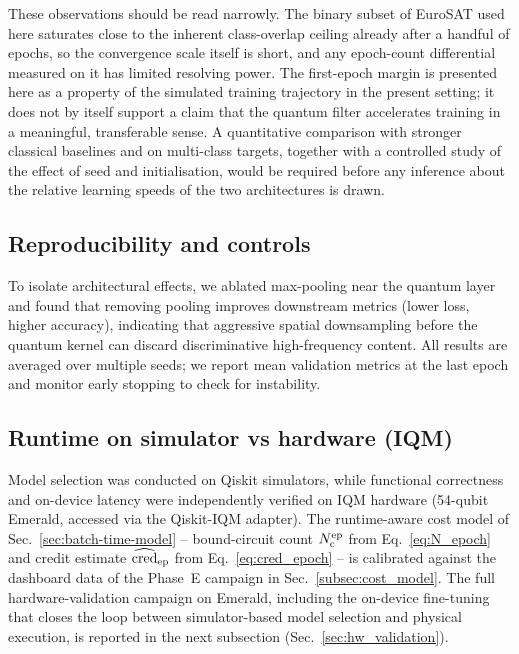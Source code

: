 These observations should be read narrowly. The binary subset of EuroSAT used here saturates close to the inherent class-overlap ceiling already after a handful of epochs, so the convergence scale itself is short, and any epoch-count differential measured on it has limited resolving power. The first-epoch margin is presented here as a property of the simulated training trajectory in the present setting; it does not by itself support a claim that the quantum filter accelerates training in a meaningful, transferable sense. A quantitative comparison with stronger classical baselines and on multi-class targets, together with a controlled study of the effect of seed and initialisation, would be required before any inference about the relative learning speeds of the two architectures is drawn.

\subsection{Reproducibility and controls}
To isolate architectural effects, we ablated max-pooling near the quantum layer and found that removing pooling improves downstream metrics (lower loss, higher accuracy), indicating that aggressive spatial downsampling before the quantum kernel can discard discriminative high-frequency content. All results are averaged over multiple seeds; we report mean validation metrics at the last epoch and monitor early stopping to check for instability.



\subsection{Runtime on simulator vs hardware (IQM)}
\label{sec:runtime-iqm}

Model selection was conducted on Qiskit simulators, while functional correctness and on-device latency were independently verified on IQM hardware (54-qubit Emerald, accessed via the Qiskit-IQM adapter). The runtime-aware cost model of Sec.~\ref{sec:batch-time-model} -- bound-circuit count $N_{\rm c}^{\rm ep}$ from Eq.~\eqref{eq:N_epoch} and credit estimate $\widehat{\mathrm{cred}}_{\rm ep}$ from Eq.~\eqref{eq:cred_epoch} -- is calibrated against the dashboard data of the Phase~E campaign in Sec.~\ref{subsec:cost_model}. The full hardware-validation campaign on Emerald, including the on-device fine-tuning that closes the loop between simulator-based model selection and physical execution, is reported in the next subsection (Sec.~\ref{sec:hw_validation}).

